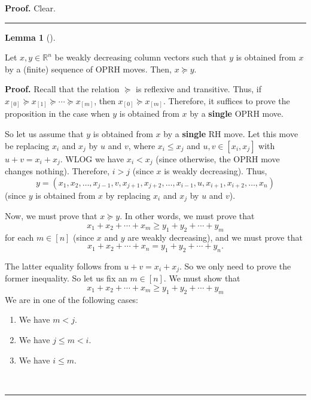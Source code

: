 \documentclass[numbers=enddot,12pt,final,onecolumn,notitlepage]{scrartcl}%
\numberwithin{exer}{subsection}
\theoremstyle{definition}
\newtheorem{lem}[theo]{Lemma}
\newenvironment{lemma}[1][]
{\begin{lem}[#1]\begin{leftbar}}
{\end{leftbar}\end{lem}}
\newenvironment{proof}[1][Proof]{\noindent\textbf{#1.} }{\ \rule{0.5em}{0.5em}}
\begin{document}
\begin{proof}
Clear.
\end{proof}

\begin{lemma}
Let $x,y\in\mathbb{R}^{n}$ be weakly decreasing column vectors such that $y$
is obtained from $x$ by a (finite) sequence of OPRH moves. Then,
$x\succcurlyeq y$.
\end{lemma}

\begin{proof}
Recall that the relation $\succcurlyeq$ is reflexive and transitive. Thus, if
$x_{\left[  0\right]  }\succcurlyeq x_{\left[  1\right]  }\succcurlyeq
\cdots\succcurlyeq x_{\left[  m\right]  }$, then $x_{\left[  0\right]
}\succcurlyeq x_{\left[  m\right]  }$. Therefore, it suffices to prove the
proposition in the case when $y$ is obtained from $x$ by a \textbf{single}
OPRH move.

So let us assume that $y$ is obtained from $x$ by a \textbf{single} RH move.
Let this move be replacing $x_{i}$ and $x_{j}$ by $u$ and $v$, where
$x_{i}\leq x_{j}$ and $u,v\in\left[  x_{i},x_{j}\right]  $ with $u+v=x_{i}%
+x_{j}$. WLOG we have $x_{i}<x_{j}$ (since otherwise, the OPRH move changes
nothing). Therefore, $i>j$ (since $x$ is weakly decreasing). Thus,%
\[
y=\left(  x_{1},x_{2},\ldots,x_{j-1},v,x_{j+1},x_{j+2},\ldots,x_{i-1}%
,u,x_{i+1},x_{i+2},\ldots,x_{n}\right)
\]
(since $y$ is obtained from $x$ by replacing $x_{i}$ and $x_{j}$ by $u$ and
$v$).

Now, we must prove that $x\succcurlyeq y$. In other words, we must prove that%
\[
x_{1}+x_{2}+\cdots+x_{m}\geq y_{1}+y_{2}+\cdots+y_{m}%
\]
for each $m\in\left[  n\right]  $ (since $x$ and $y$ are weakly decreasing),
and we must prove that%
\[
x_{1}+x_{2}+\cdots+x_{n}=y_{1}+y_{2}+\cdots+y_{n}.
\]


The latter equality follows from $u+v=x_{i}+x_{j}$. So we only need to prove
the former inequality. So let us fix an $m\in\left[  n\right]  $. We must show
that
\[
x_{1}+x_{2}+\cdots+x_{m}\geq y_{1}+y_{2}+\cdots+y_{m}%
\]
We are in one of the following cases:

\begin{enumerate}
\item We have $m<j$.

\item We have $j\leq m<i$.

\item We have $i\leq m$.
\end{enumerate}


\end{proof}
\end{document}
